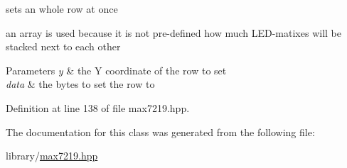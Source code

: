 sets an whole row at once 

an array is used because it is not pre-\/defined how much L\+E\+D-\/matixes will be stacked next to each other 
\begin{DoxyParams}{Parameters}
{\em y} & the Y coordinate of the row to set \\
\hline
{\em data} & the bytes to set the row to \\
\hline
\end{DoxyParams}


Definition at line 138 of file max7219.\+hpp.



The documentation for this class was generated from the following file\+:\begin{DoxyCompactItemize}
\item 
library/\mbox{\hyperlink{max7219_8hpp}{max7219.\+hpp}}\end{DoxyCompactItemize}
